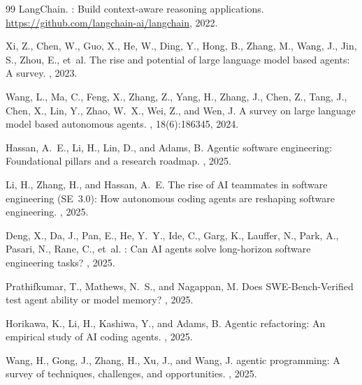 \documentclass{article}
\begin{document}
{\begin{thebibliography}{99}
{LangChain}.
: Build context-aware reasoning applications.
\newblock \url{https://github.com/langchain-ai/langchain}, 2022.

Xi, Z., Chen, W., Guo, X., He, W., Ding, Y., Hong, B., Zhang, M.,
Wang, J., Jin, S., Zhou, E., et~al.
\newblock The rise and potential of large language model based agents:
  A survey.
, 2023.

Wang, L., Ma, C., Feng, X., Zhang, Z., Yang, H., Zhang, J.,
Chen, Z., Tang, J., Chen, X., Lin, Y., Zhao, W.~X., Wei, Z., and
Wen, J.
\newblock A survey on large language model based autonomous agents.
, 18(6):186345, 2024.

Hassan, A.~E., Li, H., Lin, D., and Adams, B.
\newblock Agentic software engineering: Foundational pillars and a
  research roadmap.
, 2025.

Li, H., Zhang, H., and Hassan, A.~E.
\newblock The rise of {AI} teammates in software engineering ({SE}~3.0):
  How autonomous coding agents are reshaping software engineering.
, 2025.

Deng, X., Da, J., Pan, E., He, Y.~Y., Ide, C., Garg, K.,
Lauffer, N., Park, A., Pasari, N., Rane, C., et~al.
: Can {AI} agents solve long-horizon software
  engineering tasks?
, 2025.

Prathifkumar, T., Mathews, N.~S., and Nagappan, M.
\newblock Does {SWE-Bench-Verified} test agent ability or model memory?
, 2025.

Horikawa, K., Li, H., Kashiwa, Y., and Adams, B.
\newblock Agentic refactoring: An empirical study of {AI} coding agents.
, 2025.

Wang, H., Gong, J., Zhang, H., Xu, J., and Wang, J.
 agentic programming: A survey of techniques, challenges,
  and opportunities.
, 2025.


\end{thebibliography}}
\end{document}
